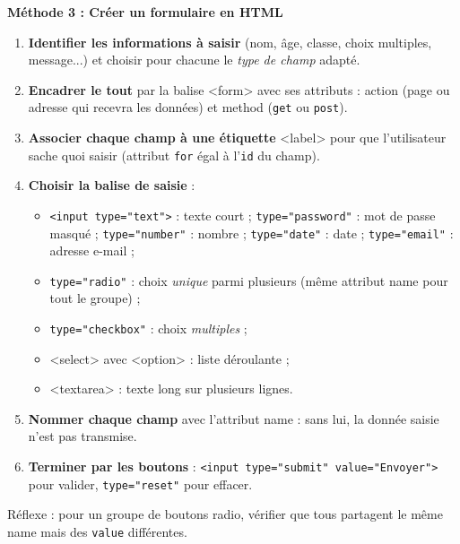 \documentclass[11pt]{article}
\newcommand{\cle}[1]{{\popxbold\color{popdark}#1}}
\begin{document}
\textbf{Méthode 3 : Créer un formulaire en HTML}\par
\begin{methode}
\begin{enumerate}
\item \textbf{Identifier les informations à saisir} (nom, âge, classe, choix multiples, message...) et choisir pour chacune le \emph{type de champ} adapté.
\item \textbf{Encadrer le tout} par la balise \cle{<form>} avec ses attributs : \cle{action} (page ou adresse qui recevra les données) et \cle{method} (\texttt{get} ou \texttt{post}).
\item \textbf{Associer chaque champ à une étiquette} \cle{<label>} pour que l'utilisateur sache quoi saisir (attribut \texttt{for} égal à l'\texttt{id} du champ).
\item \textbf{Choisir la balise de saisie} :
\begin{itemize}
\item \texttt{<input type="text">} : texte court ; \texttt{type="password"} : mot de passe masqué ; \texttt{type="number"} : nombre ; \texttt{type="date"} : date ; \texttt{type="email"} : adresse e-mail ;
\item \texttt{type="radio"} : choix \emph{unique} parmi plusieurs (même attribut \cle{name} pour tout le groupe) ;
\item \texttt{type="checkbox"} : choix \emph{multiples} ;
\item \cle{<select>} avec \cle{<option>} : liste déroulante ;
\item \cle{<textarea>} : texte long sur plusieurs lignes.
\end{itemize}
\item \textbf{Nommer chaque champ} avec l'attribut \cle{name} : sans lui, la donnée saisie n'est pas transmise.
\item \textbf{Terminer par les boutons} : \texttt{<input type="submit" value="Envoyer">} pour valider, \texttt{type="reset"} pour effacer.
\end{enumerate}
Réflexe : pour un groupe de boutons radio, vérifier que tous partagent le même \cle{name} mais des \texttt{value} différentes.
\end{methode}
\end{document}

